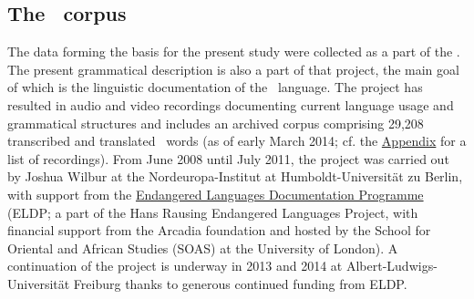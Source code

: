 \subsection{The \PSDP\ corpus}\label{PSDPcorpus}
The data forming the basis for the present study were collected as a part of the \PSDP. The present grammatical description is also a part of that project, the main goal of which is the linguistic documentation of the \PS\ language. The project has resulted in audio and video recordings documenting current language usage and grammatical structures and includes an archived corpus comprising 29,208 transcribed and translated \PS\ words (as of early March 2014; %
cf. the \hyperlink{inventoryRef}{Appendix} for a list of recordings). 
From June 2008 until July 2011, the project was carried out by Joshua Wilbur at the Nordeuropa-Institut at Humboldt-Universität zu Berlin, with support from the \href{http://www.hrelp.org/grants/}{Endangered Languages Documentation Programme} (ELDP; a part of the Hans Rausing Endangered Languages Project, with financial support from the Arcadia foundation and hosted by the School for Oriental and African Studies (SOAS) at the University of London). %
A continuation of the project is underway in 2013 and 2014 at Albert-Ludwigs-Universität Freiburg thanks to generous continued funding from ELDP. 

